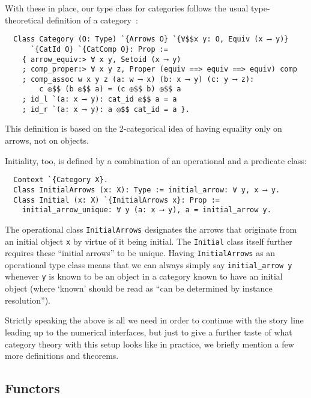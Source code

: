 \documentclass[a4paper,10pt,runningheads]{llncs}
\begin{document}
With these in place, our type class for categories follows the usual type-theoretical definition of a
category~\cite{saibi1995constructive}:
\begin{lstlisting}
  Class Category (O: Type) `{Arrows O} `{∀$$x y: O, Equiv (x ⟶ y)}
      `{CatId O} `{CatComp O}: Prop :=
    { arrow_equiv:> ∀ x y, Setoid (x ⟶ y)
    ; comp_proper:> ∀ x y z, Proper (equiv ==> equiv ==> equiv) comp
    ; comp_assoc w x y z (a: w ⟶ x) (b: x ⟶ y) (c: y ⟶ z):
        c ◎$$ (b ◎$$ a) = (c ◎$$ b) ◎$$ a
    ; id_l `(a: x ⟶ y): cat_id ◎$$ a = a
    ; id_r `(a: x ⟶ y): a ◎$$ cat_id = a }.
\end{lstlisting}
This definition is based on the 2-categorical idea of having equality only on arrows, not on objects.

Initiality, too, is defined by a combination of an operational and a predicate class:
\begin{lstlisting}
  Context `{Category X}.
  Class InitialArrows (x: X): Type := initial_arrow: ∀ y, x ⟶ y.
  Class Initial (x: X) `{InitialArrows x}: Prop :=
    initial_arrow_unique: ∀ y (a: x ⟶ y), a = initial_arrow y.
\end{lstlisting}
The operational class \lstinline|InitialArrows| designates the arrows that originate from an initial object \lstinline|x| by virtue of it being initial. The \lstinline|Initial| class itself further requires these ``initial arrows'' to be unique. Having \lstinline|InitialArrows| as an operational type class means that we can always simply say \lstinline|initial_arrow y| whenever \lstinline|y| is known to be an object in a category known to have an initial object (where `known' should be read as ``can be determined by instance resolution'').

Strictly speaking the above is all we need in order to continue with the story line leading up to the numerical interfaces, but just to give a further taste of what category theory with this setup looks like in practice, we briefly mention a few more definitions and theorems.

\subsection{Functors}
\end{document}

